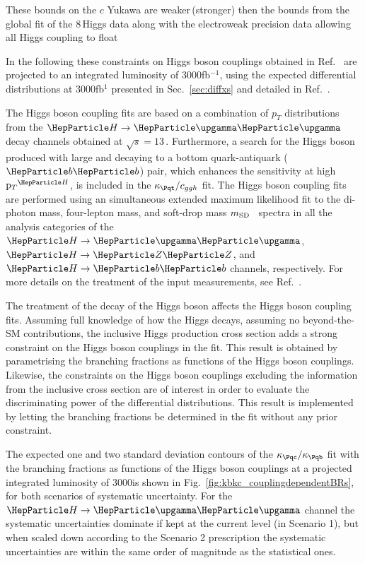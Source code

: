 \documentclass[../report.tex]{subfiles}
\begin{document}
These bounds on the $c$ Yukawa are weaker\,(stronger) then the bounds from the global fit of the 8\,\UTeV Higgs data along with the electroweak precision data allowing all Higgs coupling to float~\cite{Perez:2015aoa}  

In the following these constraints on Higgs boson couplings obtained in Ref.~\cite{Sirunyan:2018sgc} are projected to an integrated luminosity of $3000$fb$^{-1}$,
using the expected differential distributions at $3000$fb$^{1}$ 
presented in Sec.~\ref{sec:diffxs} and detailed in Ref.~\cite{CMS-PAS-FTR-18-011}.



The Higgs boson coupling fits are based on a combination of $p_T$
distributions from the $\hgg$~\cite{Sirunyan:2018kta} decay channels
obtained at $\sqrt{s}=13\,$\UTeV.
% 
Furthermore, a search for the Higgs boson produced with large \pt and decaying to a bottom quark-antiquark ($\bb$) pair, which enhances the sensitivity at high $\pth$, is included in the $\kappat/\cg$ fit.
% 
The Higgs boson coupling fits are performed using an simultaneous extended maximum likelihood fit to the di-photon mass, four-lepton mass, and soft-drop mass $m_\text{SD}$~\cite{Dasgupta:2013ihk,Larkoski:2014wba} spectra in all the analysis categories of the $\hgg$, $\hzz$, and $\hbb$ channels, respectively.
% 
For more details on the treatment of the input measurements, see Ref.~\cite{Sirunyan:2018kta}.



The treatment of the decay of the Higgs boson affects the Higgs boson coupling fits.
% 
Assuming full knowledge of how the Higgs decays, \ie assuming no beyond-the-SM contributions, the inclusive Higgs production cross section adds a strong constraint on the Higgs boson couplings in the fit.
% 
This result is obtained by parametrising the branching fractions as functions of the Higgs boson couplings.
% 
Likewise, the constraints on the Higgs boson couplings excluding the information from the inclusive cross section are of interest in order to evaluate the discriminating power of the differential distributions.
% 
This result is implemented by letting the branching fractions be determined in the fit without any prior constraint.



The expected one and two standard deviation contours of the $\kappac/\kappab$ fit with the branching fractions  as functions of the Higgs boson couplings at a projected integrated luminosity of $3000$\fbinv is shown in Fig.~\ref{fig:kbkc_couplingdependentBRs}, for both scenarios of systematic uncertainty.
% 
For the $\hgg$ channel the systematic uncertainties dominate if kept at the current level (\ie in Scenario 1), but when scaled down according to the Scenario 2 prescription the systematic uncertainties are within the same order of magnitude as the statistical ones.
\end{document}
